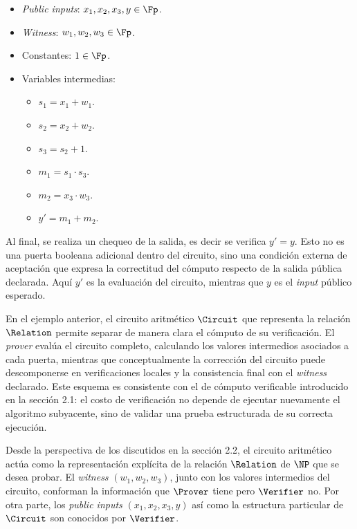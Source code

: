 \begin{itemize}[noitemsep]
		\item \textit{Public inputs}: $x_1, x_2, x_3, y \in \Fp$.
		\item \textit{Witness}: $w_1, w_2, w_3 \in \Fp$.
	\item Constantes: $1 \in \Fp$.
	\item Variables intermedias:
	\begin{itemize}[noitemsep]
		\item $s_1 = x_1 + w_1$.
		\item $s_2 = x_2 + w_2$.
		\item $s_3 = s_2 + 1$.
		\item $m_1 = s_1 \cdot s_3$.
		\item $m_2 = x_3 \cdot w_3$.
		\item $y' = m_1 + m_2$.
	\end{itemize}
\end{itemize}

Al final, se realiza un chequeo de la salida, es decir se verifica $y' = y$. Esto no es una puerta booleana adicional dentro del circuito, sino una condición externa de aceptación que expresa la correctitud del cómputo respecto de la salida pública declarada. Aquí $y'$ es la evaluación del circuito, mientras que $y$ es el \textit{input} público esperado.

En el ejemplo anterior, el circuito aritmético $\Circuit$ que representa la relación $\Relation$ permite separar de manera clara el cómputo de su verificación. El \textit{prover} evalúa el circuito completo, calculando los valores intermedios asociados a cada puerta, mientras que conceptualmente la corrección del circuito puede descomponerse en verificaciones locales y la consistencia final con el \textit{witness} declarado. Este esquema es consistente con el de cómputo verificable introducido en la sección 2.1: el costo de verificación no depende de ejecutar nuevamente el algoritmo subyacente, sino de validar una prueba estructurada de su correcta ejecución.

Desde la perspectiva de los \SNARK discutidos en la sección 2.2, el circuito aritmético actúa como la representación explícita de la relación $\Relation$ de $\NP$ que se desea probar. El \textit{witness} $(w_1, w_2, w_3)$, junto con los valores intermedios del circuito, conforman la información que $\Prover$ tiene pero $\Verifier$ no. Por otra parte, los \textit{public inputs} $(x_1,x_2,x_3,y)$ así como la estructura particular de $\Circuit$ son conocidos por $\Verifier$.

